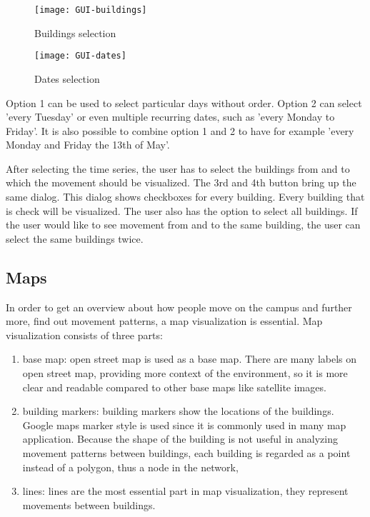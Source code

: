 \begin{figure}[H]
\centering
\texttt{[image: GUI-buildings]}
\captionsetup{justification=centering}
\caption{Buildings selection}
\label{figure:GUIbuildings}
\end{figure}

\begin{figure}[H]
\centering
\texttt{[image: GUI-dates]}
\captionsetup{justification=centering}
\caption{Dates selection}
\label{figure:GUIdates}
\end{figure}

Option 1 can be used to select particular days without order. Option 2 can select 'every Tuesday' or even multiple recurring dates, such as 'every Monday to Friday'. It is also possible to combine option 1 and 2 to have for example 'every Monday and Friday the 13th of May'. 

After selecting the time series, the user has to select the buildings from and to which the movement should be visualized. The 3rd and 4th button bring up the same dialog. This dialog shows checkboxes for every building. Every building that is check will be visualized. The user also has the option to select all buildings. If the user would like to see movement from and to the same building, the user can select the same buildings twice.

\subsection{Maps}\label{maps}
In order to get an overview about how people move on the campus and further more,  find out movement patterns, a map visualization is essential. Map visualization consists of three parts: 
\begin{enumerate}
\item base map: open street map is used as a base map. There are many labels on open street map, providing more context of the environment, so it is more clear and readable compared to other base maps like satellite images.
\item building markers: building markers show the locations of the buildings. Google maps marker style is used since it is commonly used in many map application. Because the shape of the building is not useful in analyzing movement patterns between buildings, each building is regarded as a point instead of a polygon, thus a node in the network, 
\item lines: lines are the most essential part in map visualization, they represent movements between buildings.
\end{enumerate}


